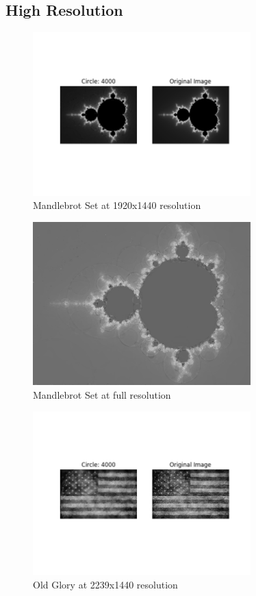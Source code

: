 \documentclass[12pt]{article}
\begin{document}
\newpage
\subsection*{High Resolution}
\begin{figure}[H]
\centering
\noindent\includegraphics[width=0.75\textwidth]{../results/mandlebrot/mandlebrot_4000}
\caption{Mandlebrot Set at 1920x1440 resolution}
\label{fig:mandlebrot}
\end{figure}

\begin{figure}[H]
\centering
\noindent\includegraphics[width=0.75\textwidth]{../results/mandlebrot/mandlebrot_raw_wrong_4000}
\caption{Mandlebrot Set at full resolution}
\label{fig:mandlebrot_raw}
\end{figure}

\begin{figure}[H]
\centering
\noindent\includegraphics[width=0.75\textwidth]{../results/old_glory/old_glory_4000}
\caption{Old Glory at 2239x1440 resolution}
\label{fig:old_glory}
\end{figure}
\end{document}
